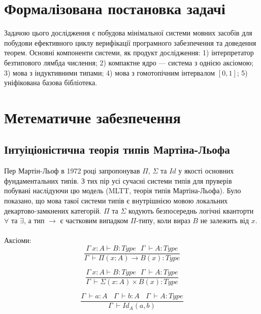 \section{Формалізована постановка задачі}
Задачою цього дослідження є побудова мінімальної системи
мовних засобів для побудови ефективного циклу верифікації програмного
забезпечення та доведення теорем. Основні компоненти системи, як продукт
дослідження: 1) інтерпретатор безтипового лямбда числення;
2) компактне ядро --- система з однією аксіомою;
3) мова з індуктивними типами;
4) мова з гомотопічним інтервалом $[0,1]$;
5) уніфікована базова бібліотека.

\section{Метематичне забезпечення}
\vspace{0.3cm}

\subsection{Інтуіціоністична теорія типів Мартіна-Льофа}
Пер Мартін-Льоф в 1972 році запропонував $\Pi$, $\Sigma$ та $Id$
у якості основних фундаментальних типів. З тих пір усі сучасні системи типів
для пруверів побувані наслідуючи цю модель (MLTT, теорія типів Мартіна-Льофа).
Було показано, що мова такої системи
типів є внутрішнією мовою локальних декартово-замкнених категорій. $\Pi$ та $\Sigma$
кодують безпосереднь логічні кванторти $\forall$ та $\exists$, а тип $\rightarrow$ є
частковим випадком $\Pi$-типу, коли вираз $B$ не залежить від $x$.

\paragraph{}
Аксіоми:
\begin{equation}
\tag{$\Pi$}
\dfrac{\Gamma\ x:A \vdash B : Type\ \ \ \Gamma\ \vdash A : Type}
      {\Gamma\ \vdash \Pi (x : A) \rightarrow B (x) : Type}
\end{equation}

\begin{equation}
\tag{$\Sigma$}
\dfrac{\Gamma\ x:A \vdash B : Type\ \ \ \Gamma\ \vdash A : Type}
      {\Gamma\ \vdash \Sigma (x : A) \times B (x) : Type}
\end{equation}

\begin{equation}
\tag{$Id$}
\dfrac{\Gamma\ \vdash a: A\ \ \ \ \Gamma\ \vdash b: A\ \ \ \ \Gamma\ \vdash A : Type }
      {\Gamma\ \vdash Id_A (a,b)}
\end{equation}

